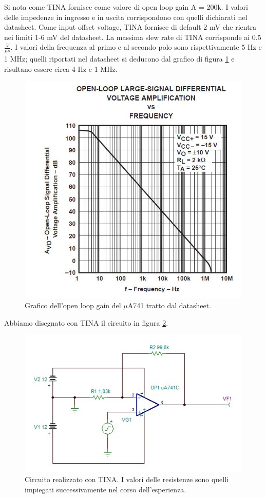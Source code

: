 \documentclass[journal, a4paper]{IEEEtran}
\begin{document}
Si nota come TINA fornisce come valore di open loop gain  A = 200k. I valori delle impedenze in ingresso e in uscita corrispondono con quelli dichiarati nel datasheet. Come input offset voltage, TINA fornisce di default 2 mV che rientra nei limiti 1-6 mV del datasheet. La massima slew rate di TINA corrisponde ai 0.5 $\frac{V}{\mu s}$. I valori della frequenza al primo e al secondo polo sono rispettivamente 5 Hz e 1 MHz; quelli riportati nel datasheet si deducono dal grafico di figura \ref{fig:openloop} e risultano essere circa 4 Hz e 1 MHz.

\begin{figure}[htp]
\centering
\includegraphics[scale=0.4]{open_loop_gain}
\caption{Grafico dell'open loop gain del $\mu$A741 tratto dal datasheet.}
\label{fig:openloop}
\end{figure}

Abbiamo disegnato con TINA il circuito in figura \ref{fig:tinaes2}.

\begin{figure}[htp]
\includegraphics[scale=0.4]{tina_es2}
\caption{Circuito realizzato con TINA. I valori delle resistenze sono quelli impiegati successivamente nel corso dell'esperienza.}
\label{fig:tinaes2}
\end{figure}
\end{document}
